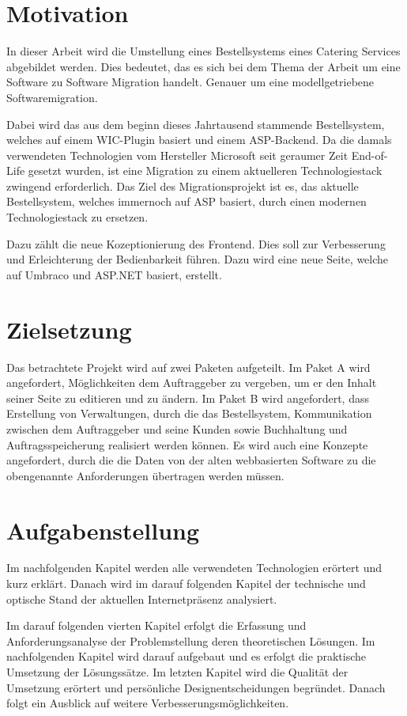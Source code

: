 \section{Motivation}

In dieser Arbeit wird die Umstellung eines Bestellsystems eines Catering Services abgebildet werden. Dies bedeutet, das es sich bei dem Thema der Arbeit um eine Software zu Software Migration handelt. Genauer um eine modellgetriebene Softwaremigration.

Dabei wird das aus dem beginn dieses Jahrtausend stammende Bestellsystem, welches auf einem \ac{WIC}-Plugin basiert und einem \ac{ASP}-Backend. Da die damals verwendeten Technologien vom Hersteller Microsoft seit geraumer Zeit End-of-Life gesetzt wurden, ist eine Migration zu einem aktuelleren Technologiestack zwingend erforderlich. Das Ziel des Migrationsprojekt ist es, das aktuelle Bestellsystem, welches immernoch auf ASP basiert, durch einen modernen Technologiestack zu ersetzen. 

Dazu zählt die neue Kozeptionierung des Frontend. Dies soll zur Verbesserung und Erleichterung der Bedienbarkeit führen. Dazu wird eine neue Seite, welche auf Umbraco und ASP.NET basiert, erstellt.

\section{Zielsetzung} 

Das betrachtete Projekt wird auf zwei Paketen aufgeteilt. Im Paket A wird angefordert, Möglichkeiten dem Auftraggeber zu vergeben, um er den Inhalt seiner Seite zu editieren und zu ändern.
Im Paket B wird angefordert, dass Erstellung von Verwaltungen, durch die das Bestellsystem, Kommunikation zwischen dem Auftraggeber und seine Kunden sowie Buchhaltung und Auftragsspeicherung realisiert werden können.
Es wird auch eine Konzepte angefordert, durch die die Daten von der alten webbasierten Software zu die obengenannte Anforderungen übertragen werden müssen. 

\section{Aufgabenstellung}

Im nachfolgenden Kapitel werden alle verwendeten Technologien erörtert und kurz erklärt. Danach wird im darauf folgenden Kapitel der technische und optische Stand der aktuellen Internetpräsenz analysiert.

 Im darauf folgenden vierten Kapitel erfolgt die Erfassung und Anforderungsanalyse der Problemstellung deren theoretischen Lösungen. Im nachfolgenden Kapitel wird darauf aufgebaut und es erfolgt die praktische Umsetzung der Lösungssätze.
Im letzten Kapitel wird die Qualität der Umsetzung erörtert und persönliche Designentscheidungen begründet.  Danach folgt ein Ausblick auf weitere Verbesserungsmöglichkeiten.

